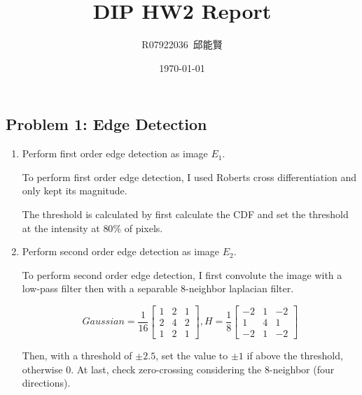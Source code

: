 \documentclass[12pt,a4paper,notitlepage,oneside,amsmath,amssymb]{article}
\begin{document}
\begin{CJK*}{UTF8}{bkai}

	\CJKtilde{}
	\CJKindent{}
	\title{\vspace{-10ex}DIP HW2 Report}
	\author{R07922036~邱能賢}
	\date{\vspace{-1ex}\today}

	\maketitle

	\vspace{-5ex}

  \section*{Problem 1: Edge Detection}

	\begin{enumerate}[label=(\alph*)]
		\item Perform first order edge detection as image \(E_1\).

    To perform first order edge detection, I used Roberts cross differentiation and only kept its magnitude.

    The threshold is calculated by first calculate the CDF and set the threshold at the intensity at \(80\%\) of pixels.

		\item Perform second order edge detection as image \(E_2\).

    To perform second order edge detection, I first convolute the image with a low-pass filter then with a separable 8-neighbor laplacian filter.

    \[
            Gaussian =
            \frac{1}{16}
            \begin{bmatrix}
				      1 & 2 & 1 \\
				      2 & 4 & 2 \\
				      1 & 2 & 1
            \end{bmatrix},
            H =
            \frac{1}{8}
			      \begin{bmatrix}
				      -2 & 1 & -2 \\
				      1 & 4  & 1 \\
				      -2 & 1 & -2
            \end{bmatrix}
          \]

    Then, with a threshold of \(\pm 2.5\), set the value to \(\pm 1\) if above the threshold, otherwise \(0\). At last, check zero-crossing considering the 8-neighbor (four directions).


\end{enumerate}
\end{CJK*}
\end{document}
